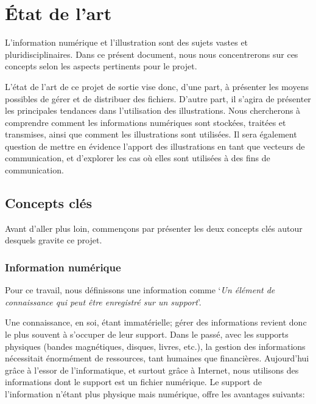 
\chapter {\'Etat de l'art}

L'information num\'erique et l'illustration sont des sujets vastes et pluridisciplinaires. Dans ce pr\'esent document, nous nous concentrerons sur ces concepts selon les aspects pertinents pour le projet. \par
\noindent L'\'etat de l'art de ce projet de sortie vise donc, d'une part, \`a pr\'esenter les moyens possibles de g\'erer et de distribuer des fichiers. D'autre part, il s'agira de pr\'esenter les principales tendances dans l'utilisation des illustrations. Nous chercherons \`a comprendre comment les informations num\'eriques sont stock\'ees, trait\'ees et transmises, ainsi que comment les illustrations sont utilis\'ees. Il sera \'egalement question de mettre en \'evidence  l'apport des illustrations en tant que vecteurs de communication, et d'explorer les cas o\`u elles sont utilis\'ees \`a des fins de communication.





\section{Concepts cl\'es}
Avant d'aller plus loin, commen\c{c}ons par pr\'esenter les deux concepts cl\'es autour desquels gravite ce projet.

\subsection{Information num\'erique}
\noindent Pour ce travail, nous d\'efinissons une information comme \lq\textit{Un \'el\'ement de connaissance qui peut \^etre enregistr\'e sur un support}\rq.\par
\noindent Une connaissance, en soi, \'etant immat\'erielle; g\'erer des informations revient donc le plus souvent \`a s'occuper de leur support. Dans le pass\'e, avec les supports physiques (bandes magn\'etiques, disques, livres, etc.), la gestion des informations n\'ecessitait \'enorm\'ement de ressources, tant humaines que financi\`eres. Aujourd'hui gr\^ace \`a l'essor de l'informatique, et surtout gr\^ace \`a Internet, nous utilisons des informations dont le support est un fichier num\'erique. Le support de l'information n'\'etant plus physique mais num\'erique, offre les avantages suivants:\\

